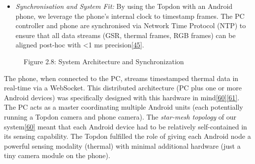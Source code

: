 \documentclass[12pt,a4paper]{article}
\begin{document}
\begin{itemize}
\item
  \emph{Synchronisation and System Fit:} By using the Topdon with an Android phone, we leverage the phone's internal clock to timestamp frames. The PC controller and phone are synchronised via Network Time Protocol (NTP) to ensure that all data streams (GSR, thermal frames, RGB frames) can be aligned post-hoc with \textless1 ms precision\href{https://github.com/buccancs/bucika_gsr/blob/7048f7f6a7536f5cd577ed2184800d3dad97fd08/docs/architecture.md\#L179-L184}{{[}45{]}}.
\end{itemize}

\begin{figure}
\centering
{}
\caption{Figure 2.8: System Architecture and Synchronization}
\end{figure}

The phone, when connected to the PC, streams timestamped thermal data in real-time via a WebSocket. This distributed architecture (PC plus one or more Android devices) was specifically designed with this hardware in mind\href{https://github.com/buccancs/bucika_gsr/blob/7048f7f6a7536f5cd577ed2184800d3dad97fd08/docs/architecture.md\#L9-L14}{{[}60{]}}\href{https://github.com/buccancs/bucika_gsr/blob/7048f7f6a7536f5cd577ed2184800d3dad97fd08/docs/architecture.md\#L40-L48}{{[}61{]}}. The PC acts as a master coordinating multiple Android units (each potentially running a Topdon camera and phone camera). The \emph{star-mesh topology} of our system\href{https://github.com/buccancs/bucika_gsr/blob/7048f7f6a7536f5cd577ed2184800d3dad97fd08/docs/architecture.md\#L9-L14}{{[}60{]}} meant that each Android device had to be relatively self-contained in its sensing capability. The Topdon fulfilled the role of giving each Android node a powerful sensing modality (thermal) with minimal additional hardware (just a tiny camera module on the phone).
\end{document}
